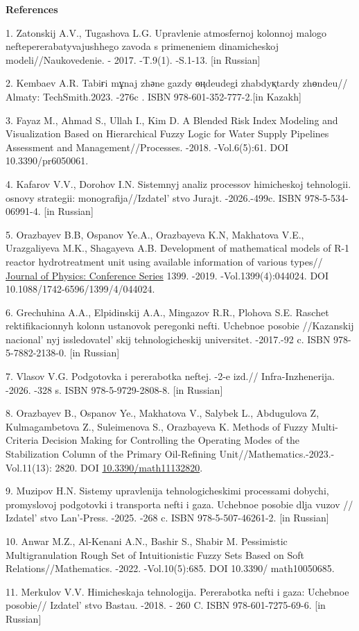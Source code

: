 \begin{center}
{\bfseries References}
\end{center}

\begin{refs}
1. Zatonskij A.V., Tugashova L.G. Upravlenie atmosfernoj kolonnoj malogo
neftepererabatyvajushhego zavoda s primeneniem dinamicheskoj
modeli//Naukovedenie. - 2017. -T.9(1). -S.1-13. {[}in Russian{]}

2. Kembaev A.R. Tabiғi mұnaj zhәne gazdy өңdeudegі zhabdyқtardy
zhөndeu// Almaty: TechSmith.2023. -276c . ISBN 978-601-352-777-2.{[}in
Kazakh{]}

3. Fayaz M., Ahmad S., Ullah I., Kim D. A Blended Risk Index Modeling
and Visualization Based on Hierarchical Fuzzy Logic for Water Supply
Pipelines Assessment and Management//Processes. -2018. -Vol.6(5):61. DOI
10.3390/pr6050061.

4. Kafarov V.V., Dorohov I.N. Sistemnyj analiz processov himicheskoj
tehnologii. osnovy strategii: monografija//Izdatel' stvo
Jurajt. -2026.-499c. ISBN 978-5-534-06991-4. {[}in Russian{]}

5. Orazbayev B.B, Ospanov Ye.A., Orazbayeva K.N, Makhatova V.E.,
Urazgaliyeva M.K., Shagayeva A.B. Development of mathematical models of
R-1 reactor hydrotreatment unit using available information of various
types// \href{https://iopscience.iop.org/journal/1742-6596}{Journal of
Physics: Conference Series} 1399. -2019. -Vol.1399(4):044024. DOI
10.1088/1742-6596/1399/4/044024.

6. Grechuhina A.A., Elpidinskij A.A., Mingazov R.R., Plohova S.E. Raschet
rektifikacionnyh kolonn ustanovok peregonki nefti. Uchebnoe posobie
//Kazanskij nacional' nyj
issledovatel' skij tehnologicheskij universitet.
-2017.-92 c. ISBN 978-5-7882-2138-0. {[}in Russian{]}

7. Vlasov V.G. Podgotovka i pererabotka neftej. -2-e izd.//
Infra-Inzhenerija. -2026. -328 s. ISBN 978-5-9729-2808-8. {[}in
Russian{]}

8. Orazbayev B., Ospanov Ye., Makhatova V., Salybek L., Abdugulova Z,
Kulmagambetova Z., Suleimenova S., Orazbayeva K. Methods of Fuzzy
Multi-Criteria Decision Making for Controlling the Operating Modes of
the Stabilization Column of the Primary Oil-Refining
Unit//Mathematics.-2023.-Vol.11(13): 2820. DOI
\href{https://doi.org/10.3390/math11132820}{10.3390/math11132820}.

9. Muzipov H.N. Sistemy upravlenija tehnologicheskimi processami
dobychi, promyslovoj podgotovki i transporta nefti i gaza. Uchebnoe
posobie dlja vuzov // Izdatel' stvo
Lan'-Press. -2025. -268 c. ISBN 978-5-507-46261-2. {[}in
Russian{]}

10. Anwar M.Z., Al-Kenani A.N., Bashir S., Shabir M. Pessimistic
Multigranulation Rough Set of Intuitionistic Fuzzy Sets Based on Soft
Relations//Mathematics. -2022. -Vol.10(5):685. DOI 10.3390/
math10050685.

11. Merkulov V.V. Himicheskaja tehnologija. Pererabotka nefti i gaza:
Uchebnoe posobie// Izdatel' stvo Bastau. -2018. - 260 C.
ISBN 978-601-7275-69-6. {[}in Russian{]}
\end{refs}

